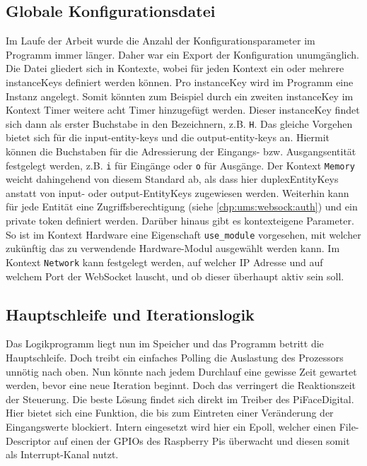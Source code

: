 \subsection{Globale Konfigurationsdatei}
Im Laufe der Arbeit wurde die Anzahl der Konfigurationsparameter im Programm immer länger. Daher war ein Export der Konfiguration unumgänglich. Die Datei gliedert sich in Kontexte, wobei für jeden Kontext ein oder mehrere instanceKeys definiert werden können. Pro instanceKey wird im Programm eine Instanz angelegt. Somit könnten zum Beispiel durch ein zweiten instanceKey im Kontext Timer weitere acht Timer hinzugefügt werden. Dieser instanceKey  findet sich dann als erster Buchstabe in den Bezeichnern, z.B. \texttt{H}. Das gleiche Vorgehen bietet sich für die input-entity-keys und die output-entity-keys an. Hiermit können die Buchstaben für die Adressierung der Eingangs- bzw. Ausgangsentität festgelegt werden, z.B. \texttt{i} für Eingänge oder \texttt{o} für Ausgänge. Der Kontext \texttt{Memory} weicht dahingehend von diesem Standard ab, als dass hier duplexEntityKeys anstatt von input- oder output-EntityKeys zugewiesen werden. Weiterhin kann für jede Entität eine Zugriffsberechtigung (siehe \autoref{chp:ums:websock:auth}) und ein private token definiert werden. Darüber hinaus gibt es kontexteigene Parameter. So ist im Kontext Hardware eine Eigenschaft \texttt{use\_module} vorgesehen, mit welcher zukünftig das zu verwendende Hardware-Modul ausgewählt werden kann. Im Kontext \texttt{Network} kann festgelegt werden, auf welcher IP Adresse und auf welchem Port der WebSocket lauscht, und ob dieser überhaupt aktiv sein soll. 

\subsection{Hauptschleife und Iterationslogik}\label{kap:ums:mainloop}
Das Logikprogramm liegt nun im Speicher und das Programm betritt die Hauptschleife. Doch treibt ein einfaches Polling die Auslastung des Prozessors unnötig nach oben. Nun könnte nach jedem Durchlauf eine gewisse Zeit gewartet werden, bevor eine neue Iteration beginnt. Doch das verringert die Reaktionszeit der Steuerung. Die beste Lösung findet sich direkt im Treiber des PiFaceDigital. Hier bietet sich eine Funktion, die bis zum Eintreten einer Veränderung der Eingangswerte blockiert. Intern eingesetzt wird hier ein Epoll, welcher einen File-Descriptor auf einen der GPIOs des Raspberry Pis überwacht und diesen somit als Interrupt-Kanal nutzt.  


